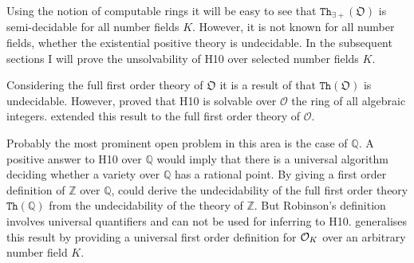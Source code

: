 Using the notion of computable rings it will be easy to see that
$\mathtt{Th}_{∃+}(\mathfrak O)$ is semi-decidable for all number fields $K$.
However, it is not known for all number fields, whether the existential positive
theory is undecidable. In the subsequent sections I will prove the unsolvability
of \textsc{H10} over selected number fields $K$.

Considering the full first order theory of $\mathfrak O$ it is a result of
\textcite{Robinson1959} that $\mathtt{Th}(\mathfrak O)$ is undecidable. However,
\textcite{Rumely1986} proved that \textsc{H10} is solvable over $\mathcal
O$ the ring of all algebraic integers. \Textcite{Dries1988}
extended this result to the full first order theory of $\mathcal O$.

Probably the most prominent open problem in this area is the case of $ℚ$. A
positive answer to \textsc{H10} over $ℚ$ would imply that there is a universal
algorithm deciding whether a variety over $ℚ$ has a rational point. By giving a
first order definition of $ℤ$ over $ℚ$, \textcite{Robinson1949} could derive the
undecidability of the full first order theory $\mathtt{Th}(ℚ)$ from the
undecidability of the theory of $ℤ$. But Robinson's definition involves universal quantifiers and can not be used for inferring to \textsc{H10}.
\Textcite{Park2013} generalises this result by providing a universal first order definition for $\mathcal{O}_{K}$ over an arbitrary number field $K$.
